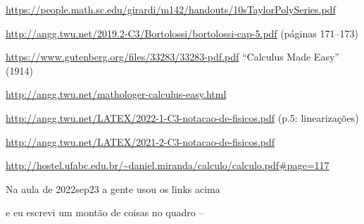 \documentclass[oneside,12pt]{article}
\begin{document}
{\scriptsize

\url{https://people.math.sc.edu/girardi/m142/handouts/10sTaylorPolySeries.pdf}

\url{http://angg.twu.net/2019.2-C3/Bortolossi/bortolossi-cap-5.pdf} (páginas 171--173)

\url{https://www.gutenberg.org/files/33283/33283-pdf.pdf} ``Calculus Made Easy'' (1914)

\url{http://angg.twu.net/mathologer-calculus-easy.html}

\url{http://angg.twu.net/LATEX/2022-1-C3-notacao-de-fisicos.pdf} (p.5: linearizações)

\url{http://angg.twu.net/LATEX/2021-2-C3-notacao-de-fisicos.pdf}

\url{http://hostel.ufabc.edu.br/~daniel.miranda/calculo/calculo.pdf\#page=117}

}


\bsk

Na aula de 2022sep23 a gente usou os links acima

e eu escrevi um montão de coisas no quadro --




\newpage

\end{document}
